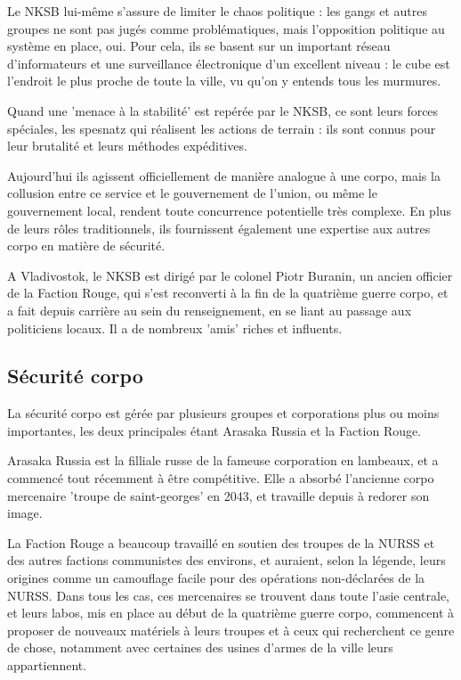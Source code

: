 \documentclass[10pt,a4paper]{book}
\begin{document}
Le NKSB lui-même s'assure de limiter le chaos politique : les gangs et autres groupes ne sont pas jugés comme problématiques, mais l'opposition politique au système en place, oui. Pour cela, ils se basent sur un important réseau d'informateurs et une surveillance électronique d'un excellent niveau : le cube est l'endroit le plus proche de toute la ville, vu qu'on y entends tous les murmures.

Quand une 'menace à la stabilité' est repérée par le NKSB, ce sont leurs forces spéciales, les spesnatz qui réalisent les actions de terrain : ils sont connus pour leur brutalité et leurs méthodes expéditives. 

Aujourd'hui ils agissent officiellement de manière analogue à une corpo, mais la collusion entre ce service et le gouvernement de l'union, ou même le gouvernement local, rendent toute concurrence potentielle très complexe. En plus de leurs rôles traditionnels, ils fournissent également une expertise aux autres corpo en matière de sécurité.

A Vladivostok, le NKSB est dirigé par le colonel Piotr Buranin, un ancien officier de la Faction Rouge, qui s'est reconverti à la fin de la quatrième guerre corpo, et a fait depuis carrière au sein du renseignement, en se liant au passage aux politiciens locaux. Il a de nombreux 'amis' riches et influents.
\subsection{Sécurité corpo}
La sécurité corpo est gérée par plusieurs groupes et corporations plus ou moins importantes, les deux principales étant Arasaka Russia et la Faction Rouge.

Arasaka Russia est la filliale russe de la fameuse corporation en lambeaux, et a commencé tout récemment à être compétitive. Elle a absorbé l'ancienne corpo mercenaire 'troupe de saint-georges' en 2043, et travaille depuis à redorer son image.

La Faction Rouge a beaucoup travaillé en soutien des troupes de la NURSS et des autres factions communistes des environs, et auraient, selon la légende, leurs origines comme un camouflage facile pour des opérations non-déclarées de la NURSS. Dans tous les cas, ces mercenaires se trouvent dans toute l'asie centrale, et leurs labos, mis en place au début de la quatrième guerre corpo, commencent à proposer de nouveaux matériels à leurs troupes et à ceux qui recherchent ce genre de chose, notamment avec certaines des usines d'armes de la ville leurs appartiennent.
\end{document}
